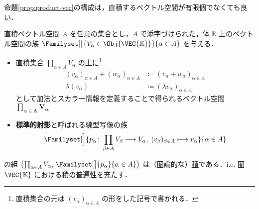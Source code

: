 \documentclass[geometry_main]{subfiles}
\begin{document}
命題\ref{prop:product-vec}の構成は，直積するベクトル空間が有限個でなくても良い．

\begin{myprop}[label=prop:product-vec-general]{直積ベクトル空間}
	$A$ を任意の集合とし，$A$ で添字づけられた，体 $\mathbb{K}$ 上のベクトル空間の族 $\Familyset[\big]{V_\alpha \in \Obj{\VEC{\mathbb{K}}}}{\alpha \in A}$ を与える．
	\begin{itemize}
		\item \hyperref[prop:product-sets]{直積集合} $\prod_{\alpha \in A} V_\alpha$ の上に\footnote{直積集合の元は $(v_\alpha)_{\alpha \in A}$ の形をした記号で書かれる．}
		\begin{align}
			(v_\alpha)_{\alpha \in A} + (w_\alpha)_{\alpha \in A} &\coloneqq (v_\alpha + w_\alpha)_{\alpha \in A} \\
			\lambda (v_\alpha) &\coloneqq (\lambda v_\alpha)_{\alpha \in A}
		\end{align}
		として加法とスカラー情報を定義することで得られるベクトル空間 $\bm{\prod_{\alpha \in A} V_\alpha}$ 
		\item \textbf{標準的射影}と呼ばれる線型写像の族
		\begin{align}
			\Familyset[\Big]{p_\alpha \colon \prod_{\beta \in A} V_\beta \lto V_\alpha,\; (v_\beta)_{\beta \in A} \lmto v_\alpha}{\alpha \in A}
		\end{align}
	\end{itemize}
	の組 $\bigl( \prod_{\alpha\in A} V_\alpha,\, \Familyset[\big]{p_\alpha}{\alpha \in A} \bigr)$ は（圏論的な）\hyperref[def:product]{積}である．i.e. 圏 $\VEC{\mathbb{K}}$ における\hyperref[cmtd:univ-product]{積の普遍性}を充たす．
\end{myprop}
\end{document}
